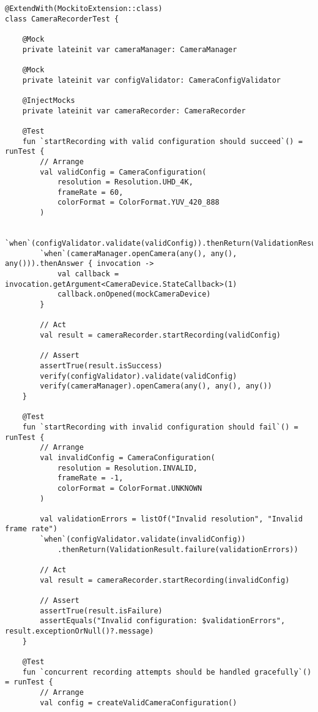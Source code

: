 \documentclass[12pt,a4paper]{article}
\begin{document}
\begin{verbatim}
@ExtendWith(MockitoExtension::class)
class CameraRecorderTest {
    
    @Mock
    private lateinit var cameraManager: CameraManager
    
    @Mock
    private lateinit var configValidator: CameraConfigValidator
    
    @InjectMocks
    private lateinit var cameraRecorder: CameraRecorder
    
    @Test
    fun `startRecording with valid configuration should succeed`() = runTest {
        // Arrange
        val validConfig = CameraConfiguration(
            resolution = Resolution.UHD_4K,
            frameRate = 60,
            colorFormat = ColorFormat.YUV_420_888
        )
        
        `when`(configValidator.validate(validConfig)).thenReturn(ValidationResult.success())
        `when`(cameraManager.openCamera(any(), any(), any())).thenAnswer { invocation ->
            val callback = invocation.getArgument<CameraDevice.StateCallback>(1)
            callback.onOpened(mockCameraDevice)
        }
        
        // Act
        val result = cameraRecorder.startRecording(validConfig)
        
        // Assert
        assertTrue(result.isSuccess)
        verify(configValidator).validate(validConfig)
        verify(cameraManager).openCamera(any(), any(), any())
    }
    
    @Test
    fun `startRecording with invalid configuration should fail`() = runTest {
        // Arrange
        val invalidConfig = CameraConfiguration(
            resolution = Resolution.INVALID,
            frameRate = -1,
            colorFormat = ColorFormat.UNKNOWN
        )
        
        val validationErrors = listOf("Invalid resolution", "Invalid frame rate")
        `when`(configValidator.validate(invalidConfig))
            .thenReturn(ValidationResult.failure(validationErrors))
        
        // Act
        val result = cameraRecorder.startRecording(invalidConfig)
        
        // Assert
        assertTrue(result.isFailure)
        assertEquals("Invalid configuration: $validationErrors", result.exceptionOrNull()?.message)
    }
    
    @Test
    fun `concurrent recording attempts should be handled gracefully`() = runTest {
        // Arrange
        val config = createValidCameraConfiguration()
        

\end{verbatim}
\end{document}
